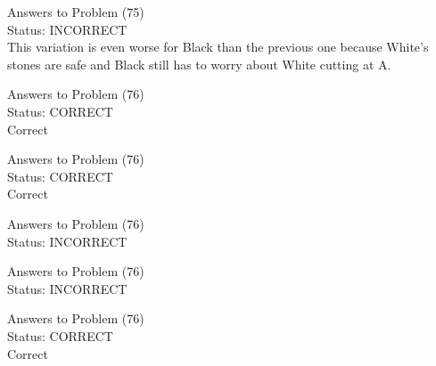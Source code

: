 \documentclass[11pt]{article}
\begin{document}
\begin{minipage}[t]{0.5\textwidth}
  {\centering
  
  Answers to Problem (75)\\
  Status: INCORRECT\\
  This variation is even worse for Black than the previous one because White's stones are safe and Black still has to worry about White cutting at A.\\
  }
\end{minipage}
\begin{minipage}[t]{0.5\textwidth}
  {\centering
  
  Answers to Problem (76)\\
  Status: CORRECT\\
  Correct\\
  }
\end{minipage}
\begin{minipage}[t]{0.5\textwidth}
  {\centering
  
  Answers to Problem (76)\\
  Status: CORRECT\\
  Correct\\
  }
\end{minipage}
\begin{minipage}[t]{0.5\textwidth}
  {\centering
  
  Answers to Problem (76)\\
  Status: INCORRECT\\
  
  }
\end{minipage}
\begin{minipage}[t]{0.5\textwidth}
  {\centering
  
  Answers to Problem (76)\\
  Status: INCORRECT\\
  
  }
\end{minipage}
\begin{minipage}[t]{0.5\textwidth}
  {\centering
  
  Answers to Problem (76)\\
  Status: CORRECT\\
  Correct\\
  }
\end{minipage}
\end{document}
